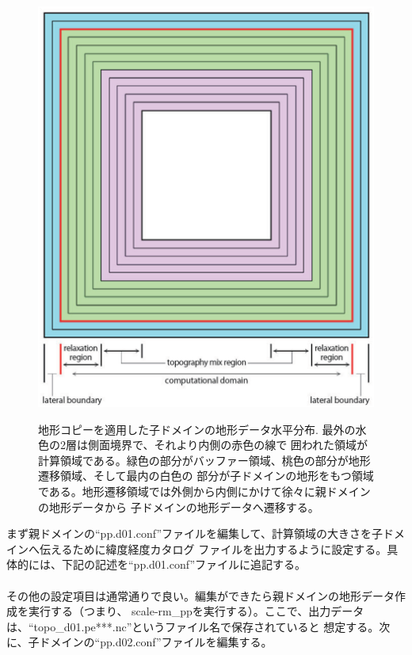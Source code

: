 \begin{figure}[tb]
\begin{center}
  \includegraphics[width=0.4\hsize]{./figure/topo_copy.eps}\\
  \caption{地形コピーを適用した子ドメインの地形データ水平分布. 最外の水色の2層は側面境界で、それより内側の赤色の線で
           囲われた領域が計算領域である。緑色の部分がバッファー領域、桃色の部分が地形遷移領域、そして最内の白色の
           部分が子ドメインの地形をもつ領域である。地形遷移領域では外側から内側にかけて徐々に親ドメインの地形データから
           子ドメインの地形データへ遷移する。}
  \label{fig_topocopy}
\end{center}
\end{figure}

まず親ドメインの``pp.d01.conf''ファイルを編集して、計算領域の大きさを子ドメインへ伝えるために緯度経度カタログ
ファイルを出力するように設定する。具体的には、下記の記述を``pp.d01.conf''ファイルに追記する。\\

\\

\noindent その他の設定項目は通常通りで良い。編集ができたら親ドメインの地形データ作成を実行する（つまり、
scale-rm\_ppを実行する）。ここで、出力データは、``topo\_d01.pe***.nc''というファイル名で保存されていると
想定する。次に、子ドメインの``pp.d02.conf''ファイルを編集する。\\


